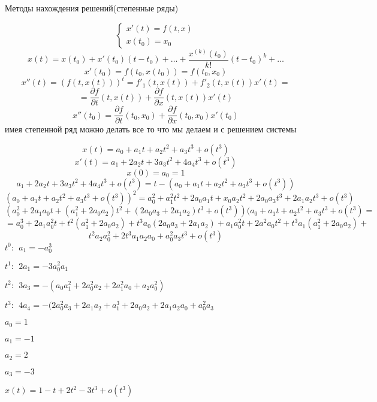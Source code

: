 \begin{title}[\Large]
  Методы нахождения решений(степенные ряды)
\end{title}

\begin{theorem}
  $$
  \left\{
  \begin{array}{l}
    x'(t) = f(t,x) \\
    x(t_0) = x_0
  \end{array}
  \right.
  $$
  $$
  x(t) = x(t_0) + x'(t_0)(t-t_0) + \ldots + \frac{x^{(k)}(t_0)}{k!}(t - t_0)^k
  + \ldots
  $$
  $$
  x'(t_0) = f(t_0, x(t_0)) = f(t_0, x_0)
  $$
  $$
  x''(t) = (f(t, x(t)))^t = f'_1(t,x(t)) + f'_2(t,x(t))x'(t) =
  $$
  $$
  = \frac{\partial f}{\partial t}(t, x(t)) + \frac{\partial f}{\partial x}
  (t, x(t))x'(t)
  $$
  $$
  x''(t_0) = \frac{\partial f}{\partial t}(t_0, x_0) +
  \frac{\partial f}{\partial x}(t_0, x_0) x'(t_0)
  $$
  имея степенной ряд можно делать все то что мы делаем и с решением системы
\end{theorem}

\begin{block}
  $$
  x(t) = a_0 + a_1t + a_2 t^2 + a_3 t^3 + o(t^3)
  $$
  $$
  x'(t) = a_1 + 2a_2t + 3a_3 t^2 + 4a_4 t^3 + o(t^3)
  $$
  $$
  x(0) = a_0 = 1
  $$
  $$
  a_1 + 2a_2 t + 3a_3 t^2 + 4a_4 t^3 + o(t^3) = t - (a_0 + a_1t + a_2t^2 +
  a_3t^3 + o(t^3))
  $$
  $$
  (a_0 + a_1t + a_2t^2 + a_3t^3 + o(t^3))^2 =
  a_0^2 + a_1^2 t^2 + 2a_0a_1 t + x_0 a_2 t^2 + 2a_0a_3 t^3 + 2a_1a_2 t^3 +
  o(t^3)
  $$
  $$
  (a_0^2 + 2a_1a_0t + (a_1^2 + 2a_0a_2)t^2 + (2a_0a_3 + 2a_1a_2)t^3 + o(t^3))
  (a_0 + a_1t + a_2t^2 + a_3t^3 + o(t^3) =
  $$
  $$
  = a_0^3 + 2a_1a_0^2t + t^2(a_1^2 + 2a_0 a_2) + t^3 a_0 (2a_0a_3 + 2a_1a_2)
  + a_1a_0^2t + 2a^2a_0t^2 + t^3a_1(a_1^2 + 2a_0a_2) +
  $$
  $$
  t^2a_2a_0^2 + 2t^3
  a_1a_2a_0 + a^2_0 a_3 t^3 + o(t^3)
  $$
  $t^0: ~~ a_1 = -a_0^3$

  $t^1: ~~ 2a_1 = -3a_0^2a_1$

  $t^2: ~~ 3a_3 = -(a_0 a_1^2 + 2a_0^2a_2 + 2a_1^2a_0 + a_2a_0^2)$

  $t^3: ~~ 4a_4 = -(2a_0^2a_3 + 2a_1a_2 + a_1^3 + 2a_0a_2 + 2a_1a_2a_0 + a_0^2
  a_3$

  $a_0 = 1$

  $a_1 = -1$

  $a_2 = 2$

  $a_3 = -3$

  $x(t) = 1 - t + 2t^2 - 3t^3 + o(t^3)$
\end{block}

